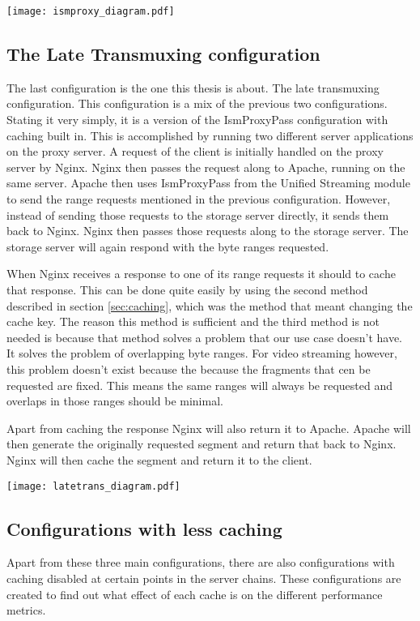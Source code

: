 \documentclass[twoside,openright]{uva-bachelor-thesis}
\begin{document}
\texttt{[image: ismproxy\_diagram.pdf]}



\subsection{The Late Transmuxing configuration}
The last configuration is the one this thesis is about. The late transmuxing
configuration. This configuration is a mix of the previous two configurations.
Stating it very simply, it is a version of the IsmProxyPass configuration with
caching built in. This is accomplished by running two different server
applications on the proxy server. A request of the client is initially handled
on the proxy server by Nginx. Nginx then passes the request along to Apache,
running on the same server. Apache then uses IsmProxyPass from the Unified
Streaming module to send the range requests mentioned in the previous
configuration.  However, instead of sending those requests to the storage server
directly, it sends them back to Nginx. Nginx then passes those requests along to
the storage server. The storage server will again respond with the byte ranges
requested.

When Nginx receives a response to one of its range requests it should to
cache that response. This can be done quite easily by using the second method
described in section \ref{sec:caching}, which was the method that meant changing
the cache key. The reason this method is sufficient and the third method is not
needed is because that method solves a problem that our use case doesn't have.
It solves the problem of overlapping byte ranges. For video streaming however,
this problem doesn't exist because the because the fragments that cen be
requested are fixed. This means the same ranges will always be requested and
overlaps in those ranges should be minimal.

Apart from caching the response Nginx will also return it to Apache. Apache will
then generate the originally requested segment and return that back to Nginx.
Nginx will then cache the segment and return it to the client.

\texttt{[image: latetrans\_diagram.pdf]}



\subsection{Configurations with less caching}
Apart from these three main configurations, there are also configurations
with caching disabled at certain points in the server chains. These
configurations are created to find out what effect of each cache is on the
different performance metrics.
\end{document}
